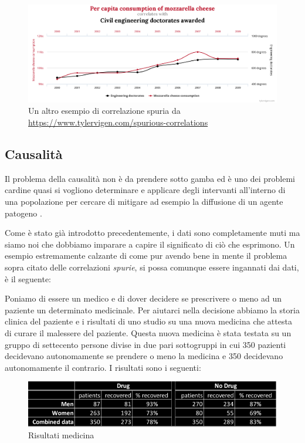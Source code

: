 \begin{figure}[h]
    \begin{center}
        \includegraphics[width=\linewidth]{img/chart1.png}
        \caption{Un altro esempio di correlazione spuria da 
        \url{https://www.tylervigen.com/spurious-correlations}}
        \label{fig:another_spurious_relations}
    \end{center}
\end{figure}

\newpage

\subsection{Causalità}
Il problema della causalità non è da prendere sotto gamba
ed è uno dei problemi cardine quasi si vogliono determinare e 
applicare degli intervanti all'interno di una popolazione per
cercare di mitigare ad esempio la diffusione di un agente 
patogeno \cite{Parascandola2001-kw}. 

Come è stato già introdotto precedentemente, i dati sono
completamente muti ma siamo noi che dobbiamo imparare a 
capire il significato di ciò che esprimono. Un esempio 
estremamente calzante di come pur avendo bene in mente il
problema sopra citato delle correlazioni \emph{spurie}, si
possa comunque essere ingannati dai dati, è il seguente:

Poniamo di essere un medico e di dover decidere se 
prescrivere o meno ad un paziente un determinato medicinale.
Per aiutarci nella decisione abbiamo la storia clinica
del paziente e i risultati di uno studio su una nuova 
medicina che attesta di curare il malessere del paziente.
Questa nuova medicina è stata testata su un gruppo di 
settecento persone divise in due pari sottogruppi in cui 
350 pazienti decidevano autonomamente se prendere o meno 
la medicina e 350 decidevano autonomamente il contrario.
I risultati sono i seguenti:

\begin{figure}[h]
    \begin{center}
        \includegraphics[width=\linewidth]{img/simpson.png}
        \caption{Risultati medicina}
        \label{fig:simpson_paradox}
    \end{center}
\end{figure}

